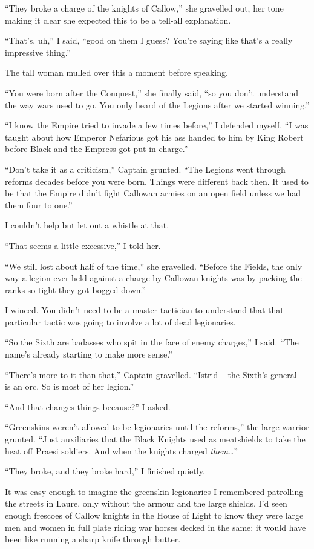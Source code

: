 \documentclass[12pt, openany]{book}
\begin{document}
“They broke a charge of the knights of Callow,” she gravelled out, her tone making it clear she expected this to be a tell-all explanation.

“That’s, uh,” I said, “good on them I guess? You’re saying like that’s a really impressive thing.”

The tall woman mulled over this a moment before speaking.

“You were born after the Conquest,” she finally said, “so you don’t understand the way wars used to go. You only heard of the Legions after we started winning.”

“I know the Empire tried to invade a few times before,” I defended myself. “I was taught about how Emperor Nefarious got his ass handed to him by King Robert before Black and the Empress got put in charge.”

“Don’t take it as a criticism,” Captain grunted. “The Legions went through reforms decades before you were born. Things were different back then. It used to be that the Empire didn’t fight Callowan armies on an open field unless we had them four to one.”

I couldn’t help but let out a whistle at that.

“That seems a little excessive,” I told her.

“We still lost about half of the time,” she gravelled. “Before the Fields, the only way a legion ever held against a charge by Callowan knights was by packing the ranks so tight they got bogged down.”

I winced. You didn’t need to be a master tactician to understand that that particular tactic was going to involve a lot of dead legionaries.

“So the Sixth are badasses who spit in the face of enemy charges,” I said. “The name’s already starting to make more sense.”

“There’s more to it than that,” Captain gravelled. “Istrid – the Sixth’s general – is an orc. So is most of her legion.”

“And that changes things because?” I asked.

“Greenskins weren’t allowed to be legionaries until the reforms,” the large warrior grunted. “Just auxiliaries that the Black Knights used as meatshields to take the heat off Praesi soldiers. And when the knights charged \textit{them}…”

“They broke, and they broke hard,” I finished quietly.

It was easy enough to imagine the greenskin legionaries I remembered patrolling the streets in Laure, only without the armour and the large shields. I’d seen enough frescoes of Callow knights in the House of Light to know they were large men and women in full plate riding war horses decked in the same: it would have been like running a sharp knife through butter.
\end{document}
